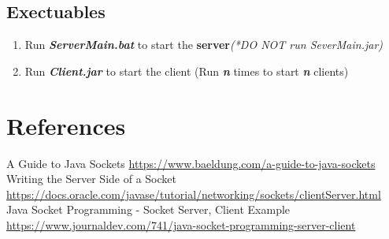 \documentclass[a4paper,11pt]{article}
\begin{document}
\subsection{Exectuables}
\begin{enumerate}
  \item Run \textbf{\textit{ServerMain.bat}} to start the \textbf{server}\textit{(*DO NOT run SeverMain.jar)}
  \item  Run \textbf{\textit{Client.jar}} to start the client (Run \textit{\textbf{n}} times to start \textit{\textbf{n}} clients)
\end{enumerate}
\section{References}
\noindent [1] A Guide to Java Sockets
\newline
\underline{https://www.baeldung.com/a-guide-to-java-sockets}
\newline
\newline
[2] Writing the Server Side of a Socket
\newline
\underline{https://docs.oracle.com/javase/tutorial/networking/sockets/clientServer.html}
\newline
\newline
[3] Java Socket Programming - Socket Server, Client Example
\newline
\underline{https://www.journaldev.com/741/java-socket-programming-server-client}
\end{document}
